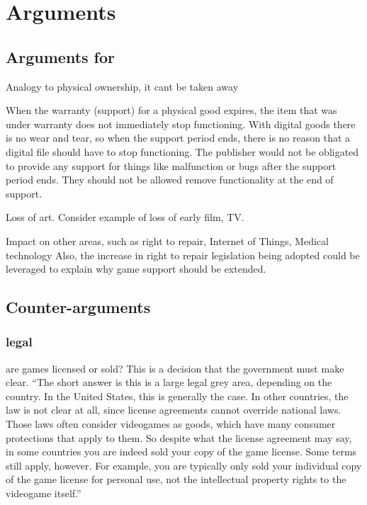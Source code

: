 \chapter{Arguments}

\section{Arguments for}

Analogy to physical ownership, it cant be taken away

When the warranty (support) for a physical good expires, the item that was under warranty does not immediately stop functioning.
With digital goods there is no wear and tear, so when the support period ends, there is no reason that a digital file should have to stop functioning.
The publisher would not be obligated to provide any support for things like malfunction or bugs after the support period ends.
They should not be allowed remove functionality at the end of support.

Loss of art. Consider example of loss of early film, TV.

Impact on other areas, such as right to repair, Internet of Things, Medical technology\cn
Also, the increase in right to repair legislation being adopted could be leveraged to explain why game support should be extended.\cn



\section{Counter-arguments}

\subsection{legal}
are games licensed or sold?
This is a decision that the government must make clear.
``The short answer is this is a large legal grey area, depending on the country.
In the United States, this is generally the case.\cn
In other countries, the law is not clear at all, since license agreements cannot override national laws.
Those laws often consider videogames as goods, which have many consumer protections that apply to them.
So despite what the license agreement may say, in some countries you are indeed sold your copy of the game license.
Some terms still apply, however.
For example, you are typically only sold your individual copy of the game license for personal use, not the intellectual property rights to the videogame itself.''

